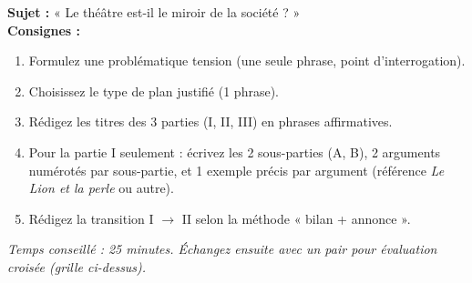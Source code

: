 \documentclass[11pt]{article}
\begin{document}
\begin{exercice}
\textbf{Sujet :} « Le théâtre est-il le miroir de la société ? »\\
\textbf{Consignes :}
\begin{enumerate}
\item Formulez une problématique tension (une seule phrase, point d'interrogation).
\item Choisissez le type de plan justifié (1 phrase).
\item Rédigez les titres des 3 parties (I, II, III) en phrases affirmatives.
\item Pour la partie I seulement : écrivez les 2 sous-parties (A, B), 2 arguments numérotés par sous-partie, et 1 exemple précis par argument (référence \emph{Le Lion et la perle} ou autre).
\item Rédigez la transition I $\rightarrow$ II selon la méthode « bilan + annonce ».
\end{enumerate}
\textit{Temps conseillé : 25 minutes. Échangez ensuite avec un pair pour évaluation croisée (grille ci-dessus).}
\end{exercice}
\end{document}
